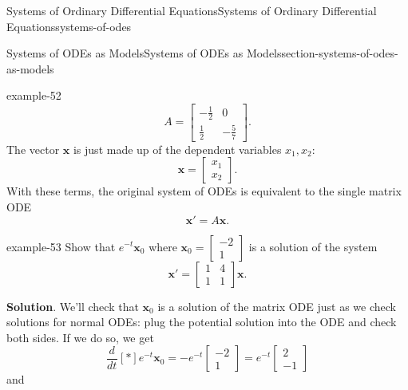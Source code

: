\documentclass[oneside,10pt,]{book}
\numberwithin{equation}{section}
\renewcommand{\vec}[1]{\mathbf{#1}}
\newcommand{\dv}[3][]{\dfrac{d^{#1} #2}{d #3^{#1}}}
\newcommand{\brackets}[1]{\left[ #1 \right]}
\newcommand{\amp}{&}
\begin{document}
\begin{chapterptx}{Systems of Ordinary Differential Equations}{}{Systems of Ordinary Differential Equations}{}{}{systems-of-odes}
\begin{sectionptx}{Systems of ODEs as Models}{}{Systems of ODEs as Models}{}{}{section-systems-of-odes-as-models}
\begin{example}{}{example-52}
\begin{equation*}
A = \begin{bmatrix}-\frac{1}{2}\amp 0\\\frac{1}{2}\amp -\frac{5}{7}\end{bmatrix}.
\end{equation*}
The vector \(\vec{x}\) is just made up of the dependent variables \(x_{1},x_{2}\):%
\begin{equation*}
\vec{x} = \begin{bmatrix}x_{1}\\x_{2}\end{bmatrix}.
\end{equation*}
With these terms, the original system of ODEs is equivalent to the single matrix ODE%
\begin{equation*}
\vec{x}' = A\vec{x}.
\end{equation*}
%
\end{example}
\begin{example}{}{example-53}%
\hypertarget{p-319}{}%
Show that \(e^{-t}\vec{x}_{0}\) where \(\vec{x}_{0} = \begin{bmatrix}-2\\1\end{bmatrix}\) is a solution of the system%
\begin{equation*}
\vec{x}' = \begin{bmatrix}1\amp 4\\1\amp 1\end{bmatrix}\vec{x}.
\end{equation*}
%
\par\smallskip%
\noindent\textbf{Solution}.\hypertarget{solution-50}{}\quad%
\hypertarget{p-320}{}%
We'll check that \(\vec{x}_{0}\) is a solution of the matrix ODE just as we check solutions for normal ODEs: plug the potential solution into the ODE and check both sides. If we do so, we get%
\begin{equation*}
\dv{}{t}\brackets*{e^{-t}\vec{x}_{0}} = -e^{-t}\begin{bmatrix}-2\\1\end{bmatrix} = e^{-t}\begin{bmatrix}2\\-1\end{bmatrix}
\end{equation*}
and%
\begin{equation*}

\end{equation*}
\end{example}
\end{sectionptx}
\end{chapterptx}
\end{document}
